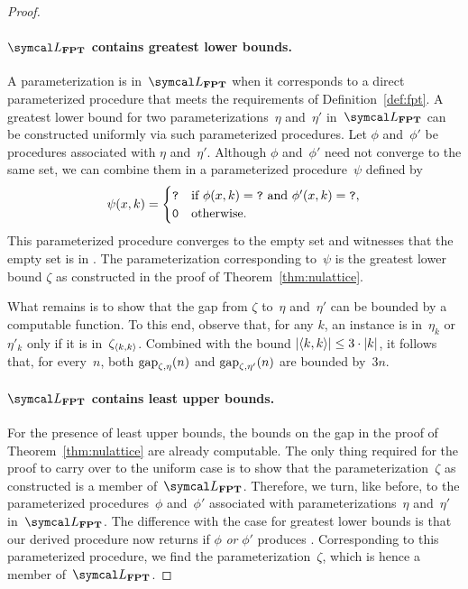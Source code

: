 \begin{proof}
  \paragraph{$\calL_\cl{FPT}$ contains greatest lower bounds.}
  A parameterization is in~$\calL_\cl{FPT}$ when it corresponds to a direct parameterized procedure that meets the requirements of Definition~\ref{def:fpt}.
  A greatest lower bound for two parameterizations~$\eta$ and~$\eta'$ in~$\calL_\cl{FPT}$ can be constructed uniformly via such parameterized procedures.
  Let $\phi$ and~$\phi'$ be procedures associated with $\eta$ and~$\eta'$.
  Although $\phi$ and~$\phi'$ need not converge to the same set, we can combine them in a parameterized procedure~$\psi$ defined by
  \begin{equation*}
    \psi(x, k) = \begin{cases}
      \textnormal{\texttt{?}}	&\text{if $\phi(x, k) = \textnormal{\texttt{?}}$ and $\phi'(x, k) = \textnormal{\texttt{?}}$}, \\
      \textnormal{\texttt{0}}	&\text{otherwise}.
    \end{cases}
  \end{equation*}
  This parameterized procedure converges to the empty set and witnesses that the empty set is in .
  The parameterization corresponding to~$\psi$ is the greatest lower bound $\zeta$ as constructed in the proof of Theorem~\ref{thm:nulattice}.

  What remains is to show that the gap from $\zeta$ to~$\eta$ and~$\eta'$ can be bounded by a computable function.
  To this end, observe that, for any $k$, an instance is in~$\eta_k$ or~$\eta'_k$ only if it is in~$\zeta_{{\langle k, k\rangle}}$.
  Combined with the bound ${\lvert{\langle k, k\rangle}\rvert} \le 3 \cdot {\lvert k\rvert}$, it follows that, for every~$n$, both $\operatorname{gap}_{\zeta, \eta}(n)$ and $\operatorname{gap}_{\zeta, \eta'}(n)$ are bounded by~$3n$.

  \paragraph{$\calL_\cl{FPT}$ contains least upper bounds.}
  For the presence of least upper bounds, the bounds on the gap in the proof of Theorem~\ref{thm:nulattice} are already computable.
  The only thing required for the proof to carry over to the uniform case is to show that the parameterization~$\zeta$ as constructed is a member of~$\calL_\cl{FPT}$.
  Therefore, we turn, like before, to the parameterized procedures~$\phi$ and~$\phi'$ associated with parameterizations~$\eta$ and~$\eta'$ in~$\calL_\cl{FPT}$.
  The difference with the case for greatest lower bounds is that our derived  procedure now returns  if $\phi$ \emph{or} $\phi'$ produces .
  Corresponding to this parameterized procedure, we find the parameterization~$\zeta$, which is hence a member of~$\calL_\cl{FPT}$.


\end{proof}
